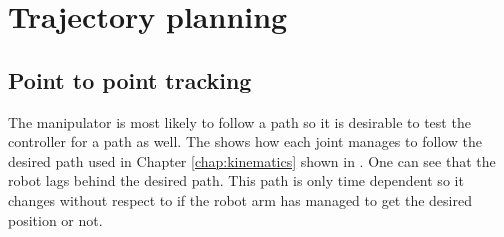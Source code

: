 \clearpage
\section{Trajectory planning}
\subsection{Point to point tracking}
The manipulator is most likely to follow a path so it is desirable to test the controller for a path as well. The  shows how each joint manages to follow the desired path used in Chapter \ref{chap:kinematics} shown in  . One can see that the robot lags behind the desired path. This path is only time dependent so it changes without respect to if the robot arm has managed to get the desired position or not.\\\\
\def\picsSiz{1.08}

